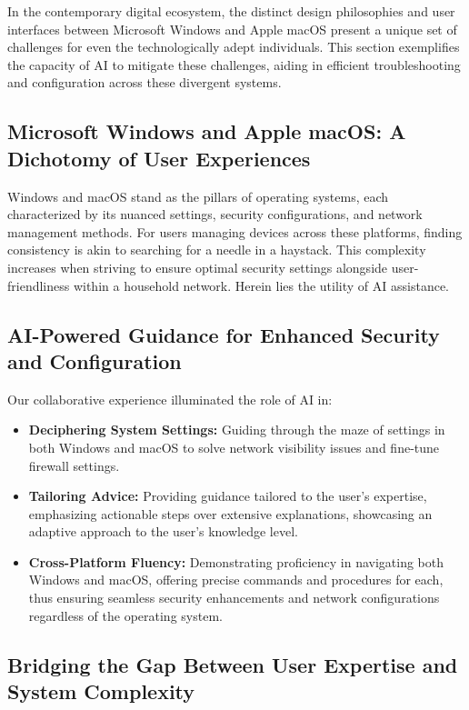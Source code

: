 \documentclass[12pt]{article}
\begin{document}
In the contemporary digital ecosystem, the distinct design philosophies and user interfaces between Microsoft Windows and Apple macOS present a unique set of challenges for even the technologically adept individuals. This section exemplifies the capacity of AI to mitigate these challenges, aiding in efficient troubleshooting and configuration across these divergent systems.

\subsection{Microsoft Windows and Apple macOS: A Dichotomy of User Experiences}

Windows and macOS stand as the pillars of operating systems, each characterized by its nuanced settings, security configurations, and network management methods. For users managing devices across these platforms, finding consistency is akin to searching for a needle in a haystack. This complexity increases when striving to ensure optimal security settings alongside user-friendliness within a household network. Herein lies the utility of AI assistance.

\subsection{AI-Powered Guidance for Enhanced Security and Configuration}

Our collaborative experience illuminated the role of AI in:

\begin{itemize}
  \item \textbf{Deciphering System Settings:} Guiding through the maze of settings in both Windows and macOS to solve network visibility issues and fine-tune firewall settings.
  \item \textbf{Tailoring Advice:} Providing guidance tailored to the user's expertise, emphasizing actionable steps over extensive explanations, showcasing an adaptive approach to the user's knowledge level.
  \item \textbf{Cross-Platform Fluency:} Demonstrating proficiency in navigating both Windows and macOS, offering precise commands and procedures for each, thus ensuring seamless security enhancements and network configurations regardless of the operating system.
\end{itemize}

\subsection{Bridging the Gap Between User Expertise and System Complexity}
\end{document}
